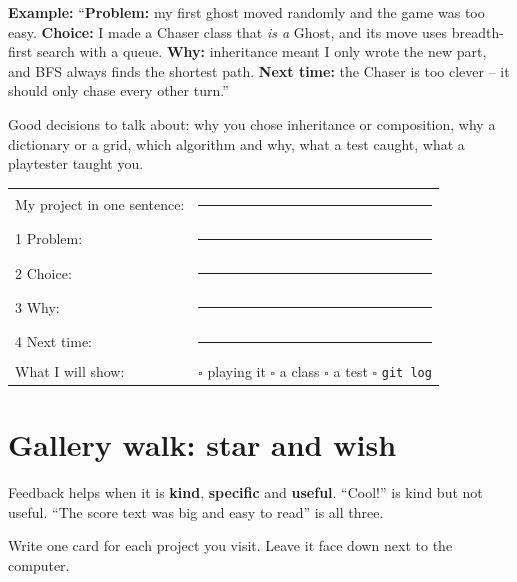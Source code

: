 \textbf{Example:} \enquote{\textbf{Problem:} my first ghost moved randomly and the game was too easy. \textbf{Choice:} I made a Chaser class that \emph{is a} Ghost, and its move uses breadth-first search with a queue. \textbf{Why:} inheritance meant I only wrote the new part, and BFS always finds the shortest path. \textbf{Next time:} the Chaser is too clever -- it should only chase every other turn.}

Good decisions to talk about: why you chose inheritance or composition, why a dictionary or a grid, which algorithm and why, what a test caught, what a playtester taught you.

\begin{exercise}
\begin{tabular}{@{}p{3.2cm}p{\dimexpr\linewidth-3.4cm-2\tabcolsep}@{}}
My project in one sentence: & \rule{\linewidth}{0.4pt}\\[8pt]
1 Problem: & \rule{\linewidth}{0.4pt}\\[8pt]
2 Choice: & \rule{\linewidth}{0.4pt}\\[8pt]
3 Why: & \rule{\linewidth}{0.4pt}\\[8pt]
4 Next time: & \rule{\linewidth}{0.4pt}\\[8pt]
What I will show: & $\square$ playing it \quad $\square$ a class \quad $\square$ a test \quad $\square$ \texttt{git log}\\
\end{tabular}
\end{exercise}

\section{Gallery walk: star and wish}
Feedback helps when it is \textbf{kind}, \textbf{specific} and \textbf{useful}. \enquote{Cool!} is kind but not useful. \enquote{The score text was big and easy to read} is all three.

\begin{exercise}
Write one card for each project you visit. Leave it face down next to the computer.
\begin{center}
\end{center}
\end{exercise}

